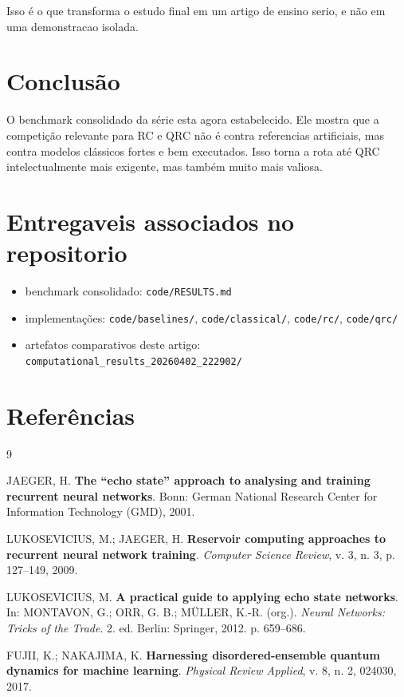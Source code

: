 \documentclass[12pt]{article}
\providecommand{\tightlist}{%
          \setlength{\itemsep}{0pt}\setlength{\parskip}{0pt}}
\begin{document}
Isso é o que transforma o estudo final em um artigo de ensino serio, e não em uma demonstracao isolada.

\section{Conclusão}\label{11-conclusuxe3o}

O benchmark consolidado da série esta agora estabelecido. Ele mostra que a competição relevante para RC e QRC não é contra referencias artificiais, mas contra modelos clássicos fortes e bem executados. Isso torna a rota até QRC intelectualmente mais exigente, mas também muito mais valiosa.

\section{Entregaveis associados no repositorio}\label{entregaveis-associados-no-repositorio}

\begin{itemize}
\tightlist
\item
  benchmark consolidado: \texttt{code/RESULTS.md}
\item
  implementações: \texttt{code/baselines/}, \texttt{code/classical/}, \texttt{code/rc/}, \texttt{code/qrc/}
\item
  artefatos comparativos deste artigo: \texttt{computational\_results\_20260402\_222902/}
\end{itemize}

\section{Referências}\label{referencias}

\begin{thebibliography}{9}

JAEGER, H. \textbf{The ``echo state'' approach to analysing and training recurrent neural networks}. Bonn: German National Research Center for Information Technology (GMD), 2001.

LUKOSEVICIUS, M.; JAEGER, H. \textbf{Reservoir computing approaches to recurrent neural network training}. \emph{Computer Science Review}, v. 3, n. 3, p. 127--149, 2009.

LUKOSEVICIUS, M. \textbf{A practical guide to applying echo state networks}. In: MONTAVON, G.; ORR, G. B.; MÜLLER, K.-R. (org.). \emph{Neural Networks: Tricks of the Trade}. 2. ed. Berlin: Springer, 2012. p. 659--686.

FUJII, K.; NAKAJIMA, K. \textbf{Harnessing disordered-ensemble quantum dynamics for machine learning}. \emph{Physical Review Applied}, v. 8, n. 2, 024030, 2017.

\end{thebibliography}

        
\end{document}
